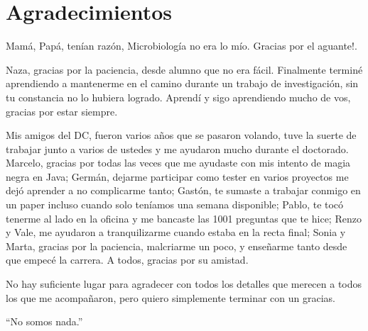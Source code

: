 \chapter*{Agradecimientos}
Mam\'a, Pap\'a, ten\'ian raz\'on, Microbiolog\'ia no era lo m\'io. Gracias por el aguante!.

Naza, gracias por la paciencia, desde alumno que no era f\'acil. Finalmente termin\'e aprendiendo a mantenerme en el camino durante un trabajo de investigaci\'on, sin tu constancia no lo hubiera logrado. Aprend\'i y sigo aprendiendo mucho de vos, gracias por estar siempre.

Mis amigos del DC, fueron varios a\~nos que se pasaron volando, tuve la suerte de trabajar junto a varios de ustedes y me ayudaron mucho durante el doctorado. Marcelo, gracias por todas las veces que me ayudaste con mis intento de magia negra en Java; Germ\'an, dejarme participar como tester en varios proyectos me dej\'o aprender a no complicarme tanto; Gast\'on, te sumaste a trabajar conmigo en un paper incluso cuando solo ten\'iamos una semana disponible; Pablo, te toc\'o tenerme al lado en la oficina y me bancaste las 1001 preguntas que te hice; Renzo y Vale, me ayudaron a tranquilizarme cuando estaba en la recta final; Sonia y Marta, gracias por la paciencia, malcriarme un poco, y ense\~narme tanto desde que empec\'e la carrera. A todos, gracias por su amistad.

No hay suficiente lugar para agradecer con todos los detalles que merecen a todos los que me acompa\~naron, pero quiero simplemente terminar con un gracias.

\cleardoublepage
\vspace*{7cm}
\hfill {\Large ``No somos nada.''}